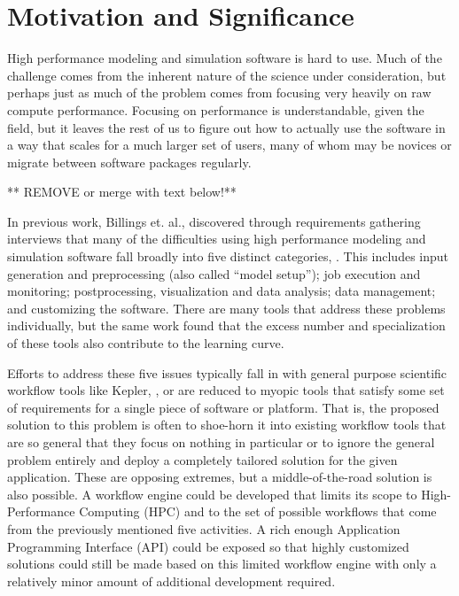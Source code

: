 \section{Motivation and Significance}\label{motivation-and-significance}

High performance modeling and simulation software is hard to use. Much
of the challenge comes from the inherent nature of the science under
consideration, but perhaps just as much of the problem comes from
focusing very heavily on raw compute performance. Focusing on
performance is understandable, given the field, but it leaves the rest
of us to figure out how to actually use the software in a way that
scales for a much larger set of users, many of whom may be novices or
migrate between software packages regularly.

** REMOVE or merge with text below!**

In previous work, Billings et. al., discovered through requirements
gathering interviews that many of the difficulties using high
performance modeling and simulation software fall broadly into five
distinct categories, \cite{billings_cbhpc}. This includes input
generation and preprocessing (also called ``model setup''); job
execution and monitoring; postprocessing, visualization and data
analysis; data management; and customizing the software. There are many
tools that address these problems individually, but the same work found
that the excess number and specialization of these tools also contribute
to the learning curve.

Efforts to address these five issues typically fall in with general
purpose scientific workflow tools like Kepler, \cite{kepler}, or are
reduced to myopic tools that satisfy some set of requirements for a
single piece of software or platform. That is, the proposed solution to
this problem is often to shoe-horn it into existing workflow tools that
are so general that they focus on nothing in particular or to ignore the
general problem entirely and deploy a completely tailored solution for
the given application. These are opposing extremes, but a
middle-of-the-road solution is also possible. A workflow engine could be
developed that limits its scope to High-Performance Computing (HPC) and
to the set of possible workflows that come from the previously mentioned
five activities. A rich enough Application Programming Interface (API)
could be exposed so that highly customized solutions could still be made
based on this limited workflow engine with only a relatively minor
amount of additional development required.

